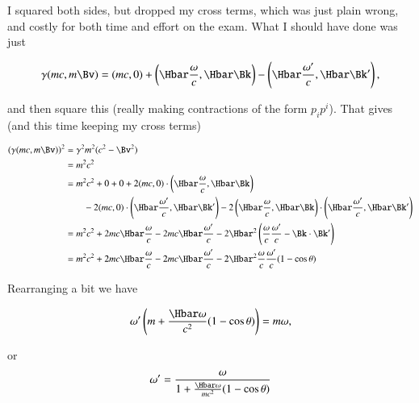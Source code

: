 {I squared both sides, but dropped my cross terms, which was just plain wrong, and costly for both time and effort on the exam.  What I should have done was just

\begin{equation}\label{eqn:relativisticElectrodynamicsExamReflection:410}
\gamma (m c, m \Bv) =
(m c, 0) + \left(\Hbar \frac{\omega}{c}, \Hbar \Bk \right)
-\left(\Hbar \frac{\omega'}{c}, \Hbar \Bk' \right),
\end{equation}

and then square this (really making contractions of the form \(p_i p^i\)).  That gives (and this time keeping my cross terms)

\begin{equation}\label{eqn:relativisticElectrodynamicsExamReflection:1350}
\begin{aligned}
(\gamma (m c, m \Bv) )^2
&= \gamma^2 m^2 (c^2 - \Bv^2) \\
&= m^2 c^2 \\
&=
m^2 c^2 + 0 + 0
+ 2 (m c, 0)
\cdot \left(\Hbar \frac{\omega}{c}, \Hbar \Bk \right) \\
&\qquad - 2 (m c, 0) \cdot \left(\Hbar \frac{\omega'}{c}, \Hbar \Bk' \right)
- 2
\left(\Hbar \frac{\omega}{c}, \Hbar \Bk \right)
\cdot \left(\Hbar \frac{\omega'}{c}, \Hbar \Bk' \right) \\
&=
m^2 c^2 + 2 m c \Hbar \frac{\omega}{c} - 2 m c \Hbar \frac{\omega'}{c}
- 2\Hbar^2 \left(
\frac{\omega}{c} \frac{\omega'}{c}
-
\Bk \cdot \Bk'
\right) \\
&=
m^2 c^2 + 2 m c \Hbar \frac{\omega}{c} - 2 m c \Hbar \frac{\omega'}{c}
- 2\Hbar^2
\frac{\omega}{c} \frac{\omega'}{c} (1 - \cos\theta)
\end{aligned}
\end{equation}

Rearranging a bit we have

\begin{equation}\label{eqn:relativisticElectrodynamicsExamReflection:430}
\omega' \left( m + \frac{\Hbar \omega}{c^2} ( 1 - \cos\theta ) \right) = m \omega,
\end{equation}

or
\begin{equation}\label{eqn:relativisticElectrodynamicsExamReflection:450}
\omega' = \frac{\omega}{
1 + \frac{\Hbar \omega}{m c^2} ( 1 - \cos\theta )
}
\end{equation}
} %

